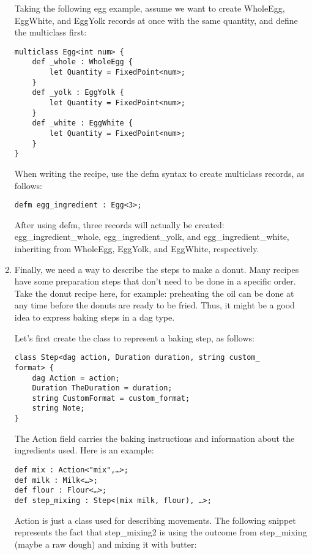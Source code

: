 \begin{enumerate}
Taking the following egg example, assume we want to create WholeEgg, EggWhite, and EggYolk records at once with the same quantity, and define the multiclass first:

\begin{lstlisting}[style=styleCXX]
multiclass Egg<int num> {
	def _whole : WholeEgg {
		let Quantity = FixedPoint<num>;
	}
	def _yolk : EggYolk {
		let Quantity = FixedPoint<num>;
	}
	def _white : EggWhite {
		let Quantity = FixedPoint<num>;
	}
}
\end{lstlisting}

When writing the recipe, use the defm syntax to create multiclass records, as follows:

\begin{lstlisting}[style=styleCXX]
defm egg_ingredient : Egg<3>;
\end{lstlisting}

After using defm, three records will  actually be created: egg\_ingredient\_whole, egg\_ingredient\_yolk, and egg\_ingredient\_white, inheriting from WholeEgg, EggYolk, and EggWhite, respectively.

\item Finally, we need a way to describe the steps to make a donut. Many recipes have some preparation steps that don't need to be done in a specific order. Take the donut recipe here, for example: preheating the oil can be done at any time before the donuts are ready to be fried. Thus, it might be a good idea to express baking steps in a dag type.

Let's first create the class to represent a baking step, as follows:

\begin{lstlisting}[style=styleCXX]
class Step<dag action, Duration duration, string custom_
format> {
	dag Action = action;
	Duration TheDuration = duration;
	string CustomFormat = custom_format;
	string Note;
}
\end{lstlisting}

The Action field carries the baking instructions and information about the ingredients used. Here is an example:

\begin{lstlisting}[style=styleCXX]
def mix : Action<"mix",…>;
def milk : Milk<…>;
def flour : Flour<…>;
def step_mixing : Step<(mix milk, flour), …>;
\end{lstlisting}

Action is just a class used for describing movements. The following snippet represents the fact that step\_mixing2 is using the outcome from step\_mixing (maybe a raw dough) and mixing it with butter:


\end{enumerate}
